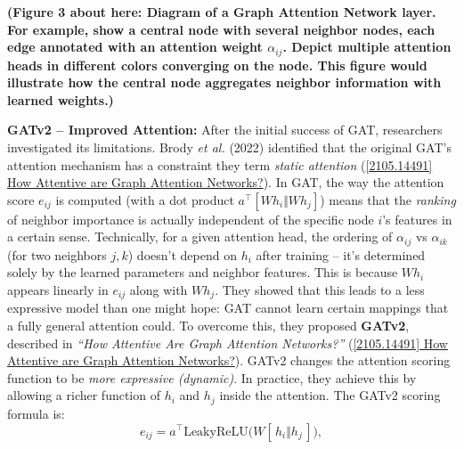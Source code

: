 \documentclass[12pt,a4paper]{report}
\begin{document}
\textbf{(Figure 3 about here: Diagram of a Graph Attention Network layer. For example, show a central node with several neighbor nodes, each edge annotated with an attention weight \(\alpha_{ij}\). Depict multiple attention heads in different colors converging on the node. This figure would illustrate how the central node aggregates neighbor information with learned weights.)}

\textbf{GATv2 – Improved Attention:} After the initial success of GAT, researchers investigated its limitations. Brody \textit{et al.} (2022) identified that the original GAT’s attention mechanism has a constraint they term \textit{static attention} (\href{https://arxiv.org/abs/2105.14491#:~:text=given%20its%20own%20representation%20as,a%20dynamic%20graph%20attention%20variant}{[2105.14491] How Attentive are Graph Attention Networks?}). In GAT, the way the attention score \(e_{ij}\) is computed (with a dot product \(a^\top [W h_i \Vert W h_j]\)) means that the \textit{ranking} of neighbor importance is actually independent of the specific node \(i\)’s features in a certain sense. Technically, for a given attention head, the ordering of \(\alpha_{ij}\) vs \(\alpha_{ik}\) (for two neighbors \(j,k\)) doesn’t depend on \(h_i\) after training – it’s determined solely by the learned parameters and neighbor features. This is because \(W h_i\) appears linearly in \(e_{ij}\) along with \(W h_j\). They showed that this leads to a less expressive model than one might hope: GAT cannot learn certain mappings that a fully general attention could. To overcome this, they proposed \textbf{GATv2}, described in \textit{“How Attentive Are Graph Attention Networks?”} (\href{https://arxiv.org/abs/2105.14491#:~:text=given%20its%20own%20representation%20as,a%20dynamic%20graph%20attention%20variant}{[2105.14491] How Attentive are Graph Attention Networks?}). GATv2 changes the attention scoring function to be \textit{more expressive (dynamic)}. In practice, they achieve this by allowing a richer function of \(h_i\) and \(h_j\) inside the attention. The GATv2 scoring formula is:
\[
e_{ij} = a^\top \mathrm{LeakyReLU}\!\Big(W [\,h_i \Vert h_j\,]\Big),
\]
\end{document}
